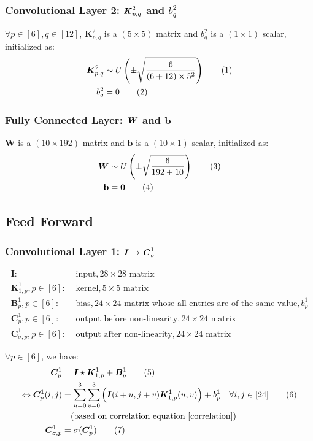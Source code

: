 \documentclass[12pt]{article}
\renewcommand{\vec}[1]{\mathbf{#1}}
\newcommand\numberthis{\stepcounter{equation}\tag{\theequation}}
\begin{document}
\subsubsection{Convolutional Layer 2: $\textbf{\textit{K}}^2_{p,q}$ and $b^2_q$}
$\forall p \in [6], q \in [12]$, $\bm{K}^2_{p,q}$ is a $(5 \times 5)$ matrix and $b^2_q$ is a $(1 \times 1)$ scalar, initialized as:
\begin{align*}
    \bm{K}^2_{p,q} &\sim U\left(\pm \sqrt{\frac{6}{(6 + 12) \times 5^2}}\right)
    \numberthis
    \\
    b^2_q &= 0
    \numberthis
\end{align*}
\subsubsection{Fully Connected Layer: $\textbf{\textit{W}}$ and $\vec{b}$}
$\bm{W}$ is a $(10 \times 192)$ matrix and $\vec{b}$ is a $(10 \times 1)$ scalar, initialized as:
\begin{align*}
    \bm{W} &\sim U\left(\pm \sqrt{\frac{6}{192 + 10}}\right)
    \numberthis
    \\
    \vec{b} &= \vec{0}
    \numberthis
\end{align*}

\subsection{Feed Forward}
\subsubsection{Convolutional Layer 1: $\textbf{\textit{I}} \rightarrow \textbf{\textit{C}}^1_\sigma$}

\begin{align*}
    \bm{I}:& \text{ input}, 28 \times 28 \text{ matrix}\\
    \bm{K}^1_{1, p}, p \in [6]:& \text{ kernel}, 5 \times 5 \text{ matrix}\\
    \bm{B}^1_p, p \in [6]:& \text{ bias}, 24 \times 24 \text{ matrix whose all entries are of the same value}, b^1_p\\
    \bm{C}^1_p, p \in [6]:& \text{ output before non-linearity}, 24 \times 24 \text{ matrix}\\
    \bm{C}^1_{\sigma, p}, p \in [6]:& \text{ output after non-linearity}, 24 \times 24 \text{ matrix}
\end{align*}

$\forall p \in [6]$, we have:
\begin{align*}
    \bm{C}^1_p &= \bm{I} \star \bm{K}^1_{1, p} + \bm{B}^1_p
    \numberthis \label{C1}
    \\
    \Leftrightarrow \bm{C}^1_p(i, j) &= \sum_{u = 0}^3\sum_{v = 0}^3\Big(\bm{I}(i + u, j + v)\bm{K}^1_{1,p}(u, v)\Big) + b^1_p \quad \forall i, j \in [24]
    \numberthis \label{C1_indexbased}
    \\
    &\quad(\text{based on correlation equation } \eqref{correlation})
    \\
    \bm{C}^1_{\sigma, p} &= \sigma(\bm{C}^1_p)
    \numberthis \label{C1_sigma}
\end{align*}
\end{document}
